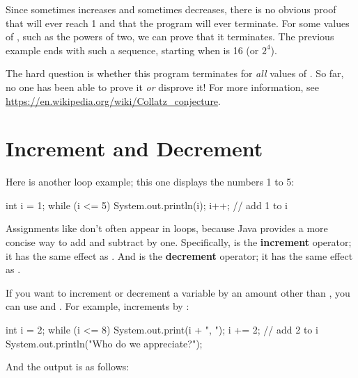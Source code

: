 Since  sometimes increases and sometimes decreases, there is no obvious proof that  will ever reach 1 and that the program will ever terminate.
For some values of , such as the powers of two, we can prove that it terminates.
The previous example ends with such a sequence, starting when  is 16 (or $2^4$).

The hard question is whether this program terminates for {\em all} values of .
So far, no one has been able to prove it {\em or} disprove it!
For more information, see \url{https://en.wikipedia.org/wiki/Collatz_conjecture}.


\section{Increment and Decrement}

Here is another  loop example; this one displays the numbers 1 to 5:

\begin{code}
int i = 1;
while (i <= 5) {
    System.out.println(i);
    i++;  // add 1 to i
}
\end{code}


Assignments like  don't often appear in loops, because Java provides a more concise way to add and subtract by one.
Specifically, \java{++} is the {\bf increment} operator; it has the same effect as .
And \java{--} is the {\bf decrement} operator; it has the same effect as .


If you want to increment or decrement a variable by an amount other than , you can use \java{+=} and \java{-=}.
For example,  increments  by :

\begin{code}
int i = 2;
while (i <= 8) {
    System.out.print(i + ", ");
    i += 2;  // add 2 to i
}
System.out.println("Who do we appreciate?");
\end{code}

And the output is as follows:


